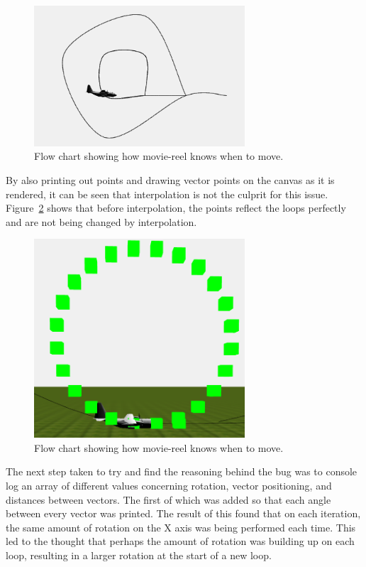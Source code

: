 \begin{figure}[h!]
  \centering
  \includegraphics[width=0.7\textwidth]{images/square.png}
  \caption{Flow chart showing how movie-reel knows when to move.}
  \label{fig:square}
\end{figure}

By also printing out points and drawing vector points on the canvas as it is rendered, it can be seen that interpolation is not the culprit for this issue. Figure~\ref{fig:vectorPoints} shows that before interpolation, the points reflect the loops perfectly and are not being changed by interpolation.

\begin{figure}[h!]
  \centering
  \includegraphics[width=0.7\textwidth]{images/vectorPoints.png}
  \caption{Flow chart showing how movie-reel knows when to move.}
  \label{fig:vectorPoints}
\end{figure}

The next step taken to try and find the reasoning behind the bug was to console log an array of different values concerning rotation, vector positioning, and distances between vectors. The first of which was added so that each angle between every vector was printed. The result of this found that on each iteration, the same amount of rotation on the X axis was being performed each time. This led to the thought that perhaps the amount of rotation was building up on each loop, resulting in a larger rotation at the start of a new loop.

